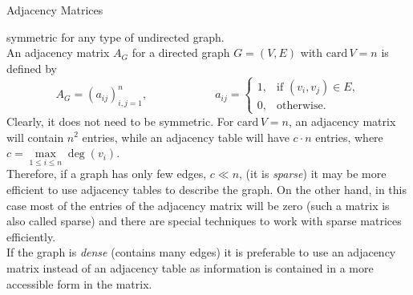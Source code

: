 \documentclass[smaller,hyperref={CJKbookmarks=true}]{beamer}
\begin{document}
\begin{frame}{Adjacency Matrices}
\begin{spacing}{1.05}
symmetric for any type of undirected graph.\\[7pt]
An adjacency matrix $A_G$ for a directed graph $G=(V,E)$ with $\text{card}\,V=n$ is defined by
\[A_G=(a_{ij})_{i,j=1}^n,\qquad\qquad\qquad
a_{ij}=\begin{cases}
         1, & \mbox{if }(v_i,v_j)\in E, \\
         0, & \mbox{otherwise}.
       \end{cases}\]
Clearly, it does not need to be symmetric.
\newpage
\vspace*{9pt}
For $\text{card}\,V=n$, an adjacency matrix will contain $n^2$ entries, while an adjacency table will have $c\cdot n$ entries, where $c=\max\limits_{1\leq i\leq n}\deg(v_i)$.\\[6pt]
Therefore, if a graph has only few edges, $c\ll n$, (it is \emph{sparse}) it may be
more efficient to use adjacency tables to describe the graph. On the other
hand, in this case most of the entries of the adjacency matrix will be zero
(such a matrix is also called sparse) and there are special techniques to
work with sparse matrices efficiently.\\[6pt]
If the graph is \emph{dense} (contains many edges) it is preferable to use an
adjacency matrix instead of an adjacency table as information is contained
in a more accessible form in the matrix.
\end{spacing}
\end{frame}
\end{document}
